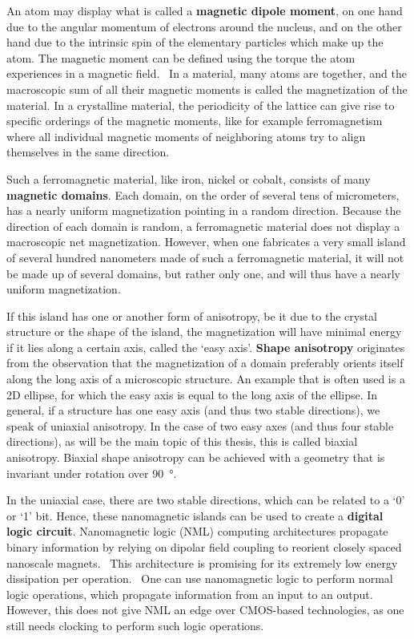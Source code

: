 \documentclass[11pt,a4paper,english]{article}
\begin{document}
\noindent An atom may display what is called a \textbf{magnetic dipole moment}, on one hand due to the angular momentum of electrons around the nucleus, and on the other hand due to the intrinsic spin of the elementary particles which make up the atom. The magnetic moment can be defined using the torque the atom experiences in a magnetic field.~\cite{IntroMagneticMaterials} In a material, many atoms are together, and the macroscopic sum of all their magnetic moments is called the magnetization of the material. In a crystalline material, the periodicity of the lattice can give rise to specific orderings of the magnetic moments, like for example ferromagnetism where all individual magnetic moments of neighboring atoms try to align themselves in the same direction. \par 
Such a ferromagnetic material, like iron, nickel or cobalt, consists of many \textbf{magnetic domains}. Each domain, on the order of several tens of micrometers, has a nearly uniform magnetization pointing in a random direction. Because the direction of each domain is random, a ferromagnetic material does not display a macroscopic net magnetization. However, when one fabricates a very small island of several hundred nanometers made of such a ferromagnetic material, it will not be made up of several domains, but rather only one, and will thus have a nearly uniform magnetization. \par
If this island has one or another form of anisotropy, be it due to the crystal structure or the shape of the island, the magnetization will have minimal energy if it lies along a certain axis, called the `easy axis'. \textbf{Shape anisotropy} originates from the observation that the magnetization of a domain preferably orients itself along the long axis of a microscopic structure. An example that is often used is a 2D ellipse, for which the easy axis is equal to the long axis of the ellipse. In general, if a structure has one easy axis (and thus two stable directions), we speak of uniaxial anisotropy. In the case of two easy axes (and thus four stable directions), as will be the main topic of this thesis, this is called biaxial anisotropy. Biaxial shape anisotropy can be achieved with a geometry that is invariant under rotation over \SI{90}{\degree}. \par
In the uniaxial case, there are two stable directions, which can be related to a `0' or `1' bit. Hence, these nanomagnetic islands can be used to create a \textbf{digital logic circuit}. Nanomagnetic logic (NML) computing architectures propagate binary information by relying on dipolar field coupling to reorient closely spaced nanoscale magnets.~\cite{SubnanosecondPropagation_AnisotropyChains} This architecture is promising for its extremely low energy dissipation per operation.~\cite{SubnanosecondPropagation_AnisotropyChains,FourStateLogic,MQCA_RoomTemp} One can use nanomagnetic logic to perform normal logic operations, which propagate information from an input to an output. However, this does not give NML an edge over CMOS-based technologies, as one still needs clocking to perform such logic operations. \par 
\end{document}
